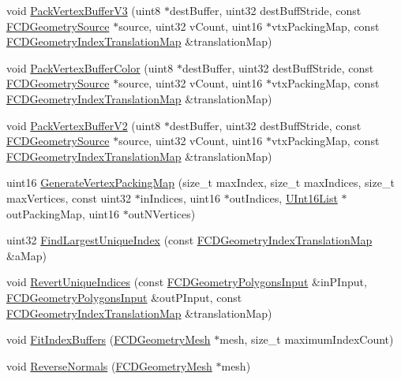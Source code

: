 \begin{DoxyCompactItemize}
\item 
void \hyperlink{namespaceFCDGeometryPolygonsTools_a4f9f9b1a23da8801703894929ed78c77}{PackVertexBufferV3} (uint8 $\ast$destBuffer, uint32 destBuffStride, const \hyperlink{classFCDGeometrySource}{FCDGeometrySource} $\ast$source, uint32 vCount, uint16 $\ast$vtxPackingMap, const \hyperlink{classfm_1_1map}{FCDGeometryIndexTranslationMap} \&translationMap)
\item 
void \hyperlink{namespaceFCDGeometryPolygonsTools_ac59d7b587eccb025da8318018b966de6}{PackVertexBufferColor} (uint8 $\ast$destBuffer, uint32 destBuffStride, const \hyperlink{classFCDGeometrySource}{FCDGeometrySource} $\ast$source, uint32 vCount, uint16 $\ast$vtxPackingMap, const \hyperlink{classfm_1_1map}{FCDGeometryIndexTranslationMap} \&translationMap)
\item 
void \hyperlink{namespaceFCDGeometryPolygonsTools_a75da2add1b594593c04bcf253d015567}{PackVertexBufferV2} (uint8 $\ast$destBuffer, uint32 destBuffStride, const \hyperlink{classFCDGeometrySource}{FCDGeometrySource} $\ast$source, uint32 vCount, uint16 $\ast$vtxPackingMap, const \hyperlink{classfm_1_1map}{FCDGeometryIndexTranslationMap} \&translationMap)
\item 
uint16 \hyperlink{namespaceFCDGeometryPolygonsTools_a18a4eb68e6b187f573ca808d78b7cf37}{GenerateVertexPackingMap} (size\_\-t maxIndex, size\_\-t maxIndices, size\_\-t maxVertices, const uint32 $\ast$inIndices, uint16 $\ast$outIndices, \hyperlink{classfm_1_1vector}{UInt16List} $\ast$outPackingMap, uint16 $\ast$outNVertices)
\item 
uint32 \hyperlink{namespaceFCDGeometryPolygonsTools_a10e774316ed58ca98bbf78a24e833ee4}{FindLargestUniqueIndex} (const \hyperlink{classfm_1_1map}{FCDGeometryIndexTranslationMap} \&aMap)
\item 
void \hyperlink{namespaceFCDGeometryPolygonsTools_ab46f2b9cf9e9e830f32e37c4af4ca6a7}{RevertUniqueIndices} (const \hyperlink{classFCDGeometryPolygonsInput}{FCDGeometryPolygonsInput} \&inPInput, \hyperlink{classFCDGeometryPolygonsInput}{FCDGeometryPolygonsInput} \&outPInput, const \hyperlink{classfm_1_1map}{FCDGeometryIndexTranslationMap} \&translationMap)
\item 
void \hyperlink{namespaceFCDGeometryPolygonsTools_aa53f5d46accb9d94e71029dcabe10510}{FitIndexBuffers} (\hyperlink{classFCDGeometryMesh}{FCDGeometryMesh} $\ast$mesh, size\_\-t maximumIndexCount)
\item 
void \hyperlink{namespaceFCDGeometryPolygonsTools_a25f9608e5084b711403e38aafd52e990}{ReverseNormals} (\hyperlink{classFCDGeometryMesh}{FCDGeometryMesh} $\ast$mesh)
\end{DoxyCompactItemize}


